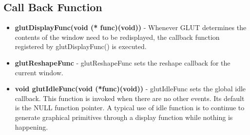 \documentclass[fontsize=12pt]{article}
\begin{document}
\subsection{Call Back Function}
\begin{itemize}
\item \textbf{glutDisplayFunc(void (* func)(void))}
- Whenever GLUT determines the contents of the window need to be redisplayed, the callback function registered by glutDisplayFunc() is executed.
\end{itemize}
\begin{itemize}
\item \textbf{glutReshapeFunc}
- glutReshapeFunc sets the reshape callback for the current window.
\end{itemize}
\begin{itemize}
\item \textbf{void glutIdleFunc(void (*func)(void))}
- glutIdleFunc sets the global idle callback. This function is invoked when there are no other events. Its default is the NULL function pointer. A typical use of idle function is to continue to generate graphical primitives through a display function while nothing is happening.
\end{itemize}
\end{document}
